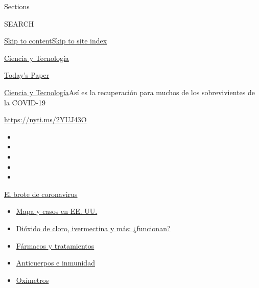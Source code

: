 Sections

SEARCH

\protect\hyperlink{site-content}{Skip to
content}\protect\hyperlink{site-index}{Skip to site index}

\href{https://www.nytimes.com/es/section/ciencia-y-tecnologia}{Ciencia y
Tecnología}

\href{https://myaccount.nytimes.com/auth/login?response_type=cookie\&client_id=vi}{}

\href{https://www.nytimes.com/section/todayspaper}{Today's Paper}

\href{/es/section/ciencia-y-tecnologia}{Ciencia y
Tecnología}\textbar{}Así es la recuperación para muchos de los
sobrevivientes de la COVID-19

\url{https://nyti.ms/2YUJ43O}

\begin{itemize}
\item
\item
\item
\item
\item
\end{itemize}

\href{https://www.nytimes.com/es/spotlight/coronavirus?action=click\&pgtype=Article\&state=default\&region=TOP_BANNER\&context=storylines_menu}{El
brote de coronavirus}

\begin{itemize}
\tightlist
\item
  \href{https://www.nytimes.com/es/interactive/2020/espanol/mundo/coronavirus-en-estados-unidos.html?action=click\&pgtype=Article\&state=default\&region=TOP_BANNER\&context=storylines_menu}{Mapa
  y casos en EE. UU.}
\item
  \href{https://www.nytimes.com/es/2020/07/23/espanol/america-latina/bolivia-cloro-coronavirus-ivermectina.html?action=click\&pgtype=Article\&state=default\&region=TOP_BANNER\&context=storylines_menu}{Dióxido
  de cloro, ivermectina y más: ¿funcionan?}
\item
  \href{https://www.nytimes.com/es/interactive/2020/science/coronavirus-tratamientos-curas.html?action=click\&pgtype=Article\&state=default\&region=TOP_BANNER\&context=storylines_menu}{Fármacos
  y tratamientos}
\item
  \href{https://www.nytimes.com/es/2020/07/28/espanol/ciencia-y-tecnologia/anticuerpos-coronavirus-inmunidad.html?action=click\&pgtype=Article\&state=default\&region=TOP_BANNER\&context=storylines_menu}{Anticuerpos
  e inmunidad}
\item
  \href{https://www.nytimes.com/es/2020/04/29/espanol/estilos-de-vida/oximetro-para-que-sirve.html?action=click\&pgtype=Article\&state=default\&region=TOP_BANNER\&context=storylines_menu}{Oxímetros}
\end{itemize}

